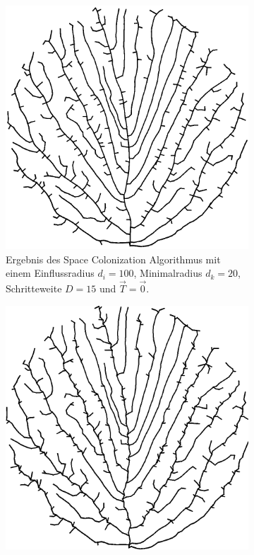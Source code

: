 \begin{figure} [hbtp]
\begin{subfigure}[t]{.35\textwidth}
		\includegraphics[width=\linewidth]{images/SCA_Extended2.png}
		\caption{Ergebnis des Space Colonization Algorithmus mit einem Einflussradius $d_i = 100$, Minimalradius $d_k = 20$, Schritteweite $D = 15$ und $\overrightarrow{T} = \overrightarrow{0}$.}
		\label{subfig:SCA_Extended2}
	\end{subfigure}
	\begin{subfigure}[t]{.35\textwidth}
		\centering
		\includegraphics[width=\linewidth]{images/SCA_Extended3.png}

\end{subfigure}
\end{figure}
